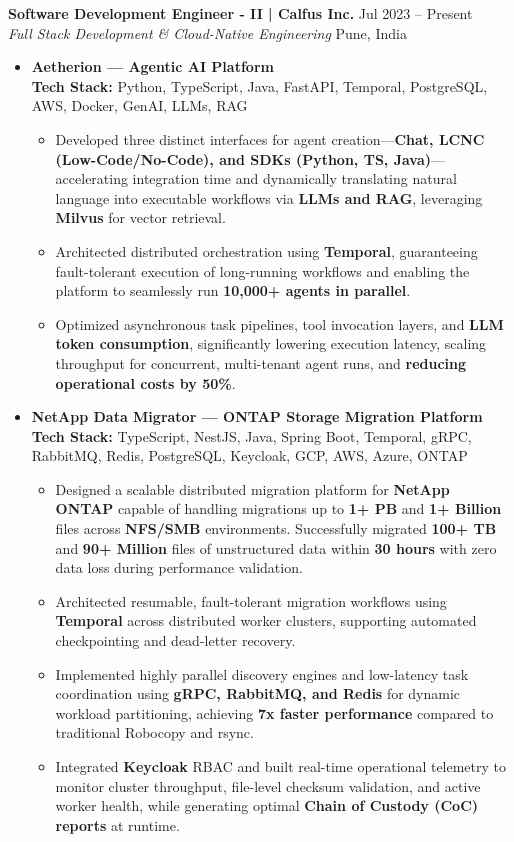 \documentclass[10pt,a4paper]{article}
\begin{document}
\textbf{Software Development Engineer - II | Calfus Inc.} \hfill Jul 2023 -- Present \\
\textit{Full Stack Development \& Cloud-Native Engineering} \hfill Pune, India
\begin{itemize}
    \item \textbf{Aetherion — Agentic AI Platform} \\
    {\small \textbf{Tech Stack:} Python, TypeScript, Java, FastAPI, Temporal, PostgreSQL, AWS, Docker, GenAI, LLMs, RAG}
    \begin{itemize}[label=$\circ$]
        \item Developed three distinct interfaces for agent creation—\textbf{Chat, LCNC (Low-Code/No-Code), and SDKs (Python, TS, Java)}—accelerating integration time and dynamically translating natural language into executable workflows via \textbf{LLMs and RAG}, leveraging \textbf{Milvus} for vector retrieval.
        \item Architected distributed orchestration using \textbf{Temporal}, guaranteeing fault-tolerant execution of long-running workflows and enabling the platform to seamlessly run \textbf{10,000+ agents in parallel}.
        \item Optimized asynchronous task pipelines, tool invocation layers, and \textbf{LLM token consumption}, significantly lowering execution latency, scaling throughput for concurrent, multi-tenant agent runs, and \textbf{reducing operational costs by 50\%}.
    \end{itemize}

    \item \textbf{NetApp Data Migrator — ONTAP Storage Migration Platform} \\
    {\small \textbf{Tech Stack:} TypeScript, NestJS, Java, Spring Boot, Temporal, gRPC, RabbitMQ, Redis, PostgreSQL, Keycloak, GCP, AWS, Azure, ONTAP}
    \begin{itemize}[label=$\circ$]
        \item Designed a scalable distributed migration platform for \textbf{NetApp ONTAP} capable of handling migrations up to \textbf{1+ PB} and \textbf{1+ Billion} files across \textbf{NFS/SMB} environments. Successfully migrated \textbf{100+ TB} and \textbf{90+ Million} files of unstructured data within \textbf{30 hours} with zero data loss during performance validation.
        \item Architected resumable, fault-tolerant migration workflows using \textbf{Temporal} across distributed worker clusters, supporting automated checkpointing and dead-letter recovery.
        \item Implemented highly parallel discovery engines and low-latency task coordination using \textbf{gRPC, RabbitMQ, and Redis} for dynamic workload partitioning, achieving \textbf{7x faster performance} compared to traditional Robocopy and rsync.
        \item Integrated \textbf{Keycloak} RBAC and built real-time operational telemetry to monitor cluster throughput, file-level checksum validation, and active worker health, while generating optimal \textbf{Chain of Custody (CoC) reports} at runtime.
    \end{itemize}


\end{itemize}
\end{document}
